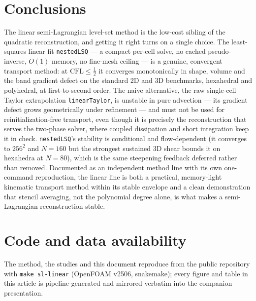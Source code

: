 \documentclass[preprint,3p,11pt]{elsarticle}
\begin{document}
\section{Conclusions}
\label{sec:conclusions}
The linear semi-Lagrangian level-set method is the low-cost sibling of the
quadratic reconstruction, and getting it right turns on a single choice. The
least-squares linear fit \texttt{nestedLSQ} --- a compact per-cell solve, no
cached pseudo-inverse, $O(1)$ memory, no fine-mesh ceiling --- is a genuine,
convergent transport method: at $\mathrm{CFL}\le\tfrac12$ it converges
monotonically in shape, volume and the band gradient defect on the standard
2D and 3D benchmarks, hexahedral and polyhedral, at first-to-second order. The
naive alternative, the raw single-cell Taylor extrapolation
\texttt{linearTaylor}, is unstable in pure advection --- its gradient defect
grows geometrically under refinement --- and must not be used for
reinitialization-free transport, even though it is precisely the
reconstruction that serves the two-phase solver, where coupled dissipation and
short integration keep it in check. \texttt{nestedLSQ}'s stability is
conditional and flow-dependent (it converges to $256^2$ and $N=160$ but the
strongest sustained 3D shear bounds it on hexahedra at $N=80$), which is the
same steepening feedback deferred rather than removed. Documented as an
independent method line with its own one-command reproduction, the linear
line is both a practical, memory-light kinematic transport method within its
stable envelope and a clean demonstration that stencil averaging, not the
polynomial degree alone, is what makes a semi-Lagrangian reconstruction
stable.

\section*{Code and data availability}
The method, the studies and this document reproduce from the public
repository with \texttt{make sl-linear} (OpenFOAM v2506, snakemake); every
figure and table in this article is pipeline-generated and mirrored
verbatim into the companion presentation.



\end{document}
